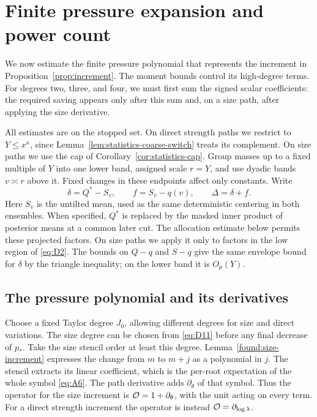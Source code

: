 \section{Finite pressure expansion and power count}\label{sec:expansion}

We now estimate the finite pressure polynomial that represents the
increment in Proposition~\ref{prop:increment}. The moment bounds control
its high-degree terms. For degrees two, three, and four, we must first
sum the signed scalar coefficients: the required saving appears only
after this sum and, on a size path, after applying the size derivative.

All estimates are on the stopped set. On direct strength paths we
restrict to \(Y\le x^\kappa\), since
Lemma~\ref{lem:statistics-coarse-switch} treats its complement. On size
paths we use the cap of Corollary~\ref{cor:statistics-cap}. Group masses
up to a fixed multiple of \(Y\) into one lower band, assigned scale
\(r=Y\), and use dyadic bands \(v\asymp r\) above it. Fixed changes in
these endpoints affect only constants. Write
\[
\delta=Q^*-S_v,\qquad f=S_v-q(v),\qquad \Delta=\delta+f.
\]
Here \(S_v\) is the untilted mean, used as the same deterministic
centering in both ensembles. When specified, \(Q^*\) is replaced by the
masked inner product of posterior means at a common later cut. The
allocation estimate below permits these projected factors. On size
paths we apply it only to factors in the low region of \eqref{eq:D2}.
The bounds on \(Q-q\) and \(S-q\) give the same envelope bound for
\(\delta\) by the triangle inequality; on the lower band it is \(O_p(Y)\).

\subsection{The pressure polynomial and its derivatives}

Choose a fixed Taylor degree \(J_0\), allowing different degrees for
size and direct variations. The size degree can be chosen from
\eqref{eq:D11} before any final decrease of \(p_*\). Take the size
stencil order at least this degree. Lemma~\ref{found:size-increment}
expresses the change from \(m\) to \(m+j\) as a polynomial in \(j\).
The stencil extracts its linear coefficient, which is the per-root
expectation of the whole symbol \eqref{eq:A6}. The path derivative
adds \(\partial_\theta\) of that symbol. Thus the operator for the size
increment is \({\cal O}=1+\partial_\theta\), with the unit acting on
every term. For a direct strength increment the operator is instead
\({\cal O}=\partial_{\log\lambda}\).

